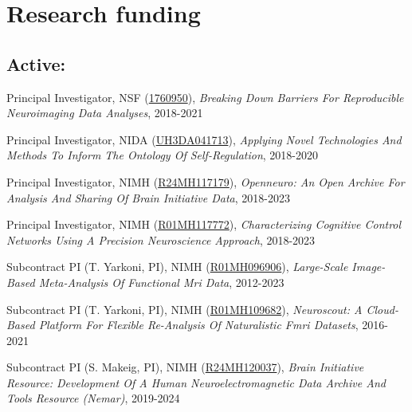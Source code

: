 \section*{Research funding}
\noindent

\subsection*{Active:}

Principal Investigator, NSF (\href{http://www.nsf.gov/awardsearch/showAward?AWD_ID=1760950&HistoricalAwards=false}{1760950}), \textit{Breaking Down Barriers For Reproducible Neuroimaging Data Analyses}, 2018-2021 \vspace{2mm}

Principal Investigator, NIDA (\href{http://projectreporter.nih.gov/project_info_description.cfm?aid=9780476}{UH3DA041713}), \textit{Applying Novel Technologies And Methods To Inform The Ontology Of Self-Regulation}, 2018-2020 \vspace{2mm}

Principal Investigator, NIMH (\href{http://projectreporter.nih.gov/project_info_description.cfm?aid=9770947}{R24MH117179}), \textit{Openneuro: An Open Archive For Analysis And Sharing Of Brain Initiative Data}, 2018-2023 \vspace{2mm}

Principal Investigator, NIMH (\href{http://projectreporter.nih.gov/project_info_description.cfm?aid=9906911}{R01MH117772}), \textit{Characterizing Cognitive Control Networks Using A Precision Neuroscience Approach}, 2018-2023 \vspace{2mm}

Subcontract PI (T. Yarkoni, PI), NIMH (\href{https://projectreporter.nih.gov/project_info_description.cfm?aid=9881347}{R01MH096906}), \textit{Large-Scale Image-Based Meta-Analysis Of Functional Mri Data}, 2012-2023 \vspace{2mm}

Subcontract PI (T. Yarkoni, PI), NIMH (\href{https://projectreporter.nih.gov/project_info_description.cfm?aid=9742532}{R01MH109682}), \textit{Neuroscout: A Cloud-Based Platform For Flexible Re-Analysis Of Naturalistic Fmri Datasets}, 2016-2021 \vspace{2mm}

Subcontract PI (S. Makeig, PI), NIMH (\href{http://projectreporter.nih.gov/project_info_description.cfm?aid=9795341}{R24MH120037}), \textit{Brain Initiative Resource: Development Of A Human Neuroelectromagnetic Data Archive And Tools Resource (Nemar)}, 2019-2024 \vspace{2mm}

